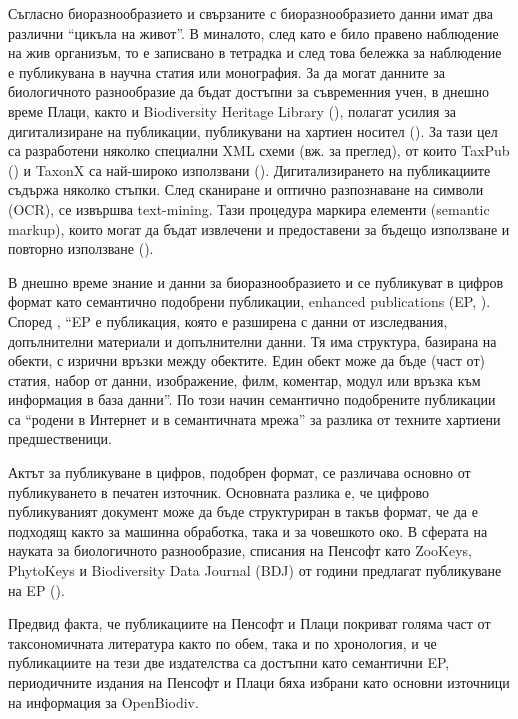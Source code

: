 Съгласно \cite{noauthor_pro-ibiosphere_2014} биоразнообразието и свързаните с биоразнообразието данни имат два различни ``цикъла на живот''. В миналото, след като е било правено наблюдение на жив организъм, то е записвано в тетрадка и след това бележка за наблюдение е публикувана в научна статия или монография. За да могат данните за биологичното разнообразие да бъдат достъпни за съвременния учен, в днешно време Плаци, както и Biodiversity Heritage Library (\cite {miller_taxonomic_2012}), полагат усилия за дигитализиране на публикации, публикувани на хартиен носител (\cite{agosti_why_2007}). За тази цел са разработени няколко специални XML схеми (вж. \cite {penev_xml_2011} за преглед), от които TaxPub (\cite {catapano_taxpub:_2010}) и TaxonX са най-широко използвани (\cite{penev_implementation_2012}). Дигитализирането на публикациите съдържа няколко стъпки. След сканиране и оптично разпознаване на символи (OCR), се извършва text-mining. Тази процедура маркира елементи (semantic markup), които могат да бъдат извлечени и предоставени за бъдещо използване и повторно използване (\cite{miller_integrating_2015}).

В днешно време знание и данни за биоразнообразието и се публикуват в цифров формат като семантично подобрени публикации, enhanced publications (EP, \cite{claerbout_electronic_1992, godtsenhoven_van_emerging_2009, shotton_semantic_2009}). Според \cite{claerbout_electronic_1992}, ``EP е публикация, която е разширена с данни от изследвания, допълнителни материали и допълнителни данни. Тя има структура, базирана на обекти, с изрични връзки между обектите. Един обект може да бъде (част от) статия, набор от данни, изображение, филм, коментар, модул или връзка към информация в база данни''. По този начин семантично подобрените публикации са ``родени в Интернет и в семантичната мрежа'' за разлика от техните хартиени предшественици.

Актът за публикуване в цифров, подобрен формат, се различава основно от публикуването в печатен източник. Основната разлика е, че цифрово публикуваният документ може да бъде структуриран в такъв формат, че да е подходящ както за машинна обработка, така и за човешкото око. В сферата на науката за биологичното разнообразие, списания на Пенсофт като ZooKeys, PhytoKeys и Biodiversity Data Journal (BDJ) от години предлагат публикуване на EP (\cite{penev_semantic_2010}).

Предвид факта, че публикациите на Пенсофт и Плаци покриват голяма част от таксономичната литература както по обем, така и по хронология, и че публикациите на тези две издателства са достъпни като семантични EP, периодичните издания на Пенсофт и Плаци бяха избрани като основни източници на информация за OpenBiodiv.

